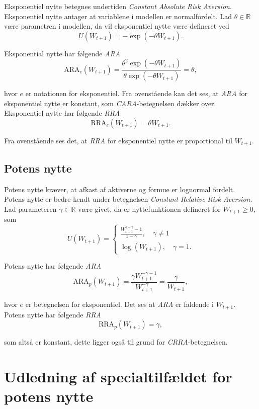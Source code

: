 \documentclass[
  a4paper,
  oneside]{memoir}
\begin{document}
Eksponentiel nytte betegnes undertiden \emph{Constant Absolute Risk Aversion}. Eksponentiel nytte antager at variablene i modellen er normalfordelt. Lad \(\theta\in\mathbb{R}\) være parametren i modellen, da vil eksponentiel nytte være defineret ved
\begin{equation*}
U(W_{t+1})=-\exp\left(-\theta W_{t+1}\right).
\end{equation*}

Eksponential nytte har følgende \emph{ARA}
\[\text{ARA}_e(W_{t+1})=\frac{\theta^2\exp\left(-\theta W_{t+1}\right)}{\theta\exp\left(-\theta W_{t+1}\right)}=\theta,\]

hvor \(e\) er notationen for eksponentiel. Fra ovenstående kan det ses, at \emph{ARA} for eksponentiel nytte er konstant, som \emph{CARA}-betegnelsen dækker over. Eksponentiel nytte har følgende \emph{RRA}
\[\text{RRA}_e(W_{t+1})= \theta W_{t+1}.\]

Fra ovenstående ses det, at \emph{RRA} for eksponentiel nytte er proportional til \(W_{t+1}\).

\hypertarget{potens-nytte-1}{%
\subsection{Potens nytte}\label{potens-nytte-1}}

Potens nytte kræver, at afkast af aktiverne og formue er lognormal fordelt. Potens nytte er bedre kendt under betegnelsen \emph{Constant Relative Risk Aversion}. Lad parameteren \(\gamma\in\mathbb{R}\) være givet, da er nyttefunktionen defineret for \(W_{t+1}\geq 0\), som
\[U(W_{t+1})=\begin{cases} \frac{W_{t+1}^{1-\gamma}-1}{1-\gamma},\quad \gamma\neq 1\\
\log(W_{t+1}),\quad \gamma = 1. \end{cases}\]

Potens nytte har følgende \emph{ARA}
\[\text{ARA}_p(W_{t+1})= \frac{\gamma W_{t+1}^{-\gamma-1}}{W_{t+1}^{-\gamma}}=\frac{\gamma}{W_{t+1}},\]

hvor \(e\) er betegnelsen for eksponentiel. Det ses at \emph{ARA} er faldende i \(W_{t+1}\). Potens nytte har følgende \emph{RRA}
\[\text{RRA}_p(W_{t+1})= \gamma,\]

som altså er konstant, dette ligger også til grund for \emph{CRRA}-betegnelsen.

\hypertarget{udledning-af-specialtilfuxe6ldet-for-potens-nytte}{%
\section{Udledning af specialtilfældet for potens nytte}\label{udledning-af-specialtilfuxe6ldet-for-potens-nytte}}
\end{document}
